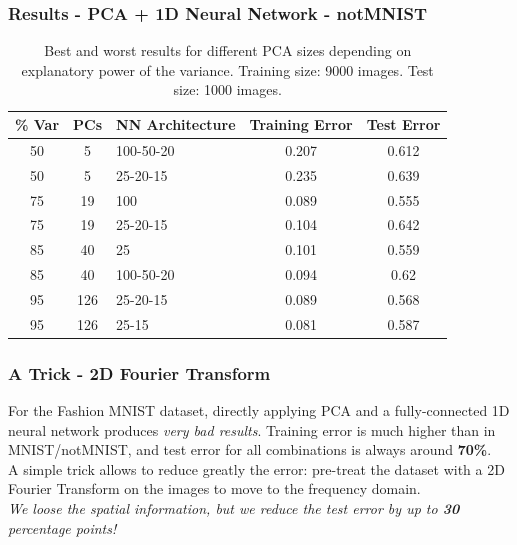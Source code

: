 \documentclass{beamer}
\begin{document}
\begin{frame}
\frametitle{Results - PCA + 1D Neural Network - notMNIST}
\begin{table}[hbt]
  \begin{tabular}{|cc|l|c|c|}
  	\hline
    \% Var & PCs & NN Architecture & Training Error & Test Error \\
    \hline
    \hline
    50 & 5 & 100-50-20 & 0.207    & 0.612\\
    50& 5 & 25-20-15 & 0.235    & 0.639\\
    \hline
    75 & 19 &  100 & 0.089    & 0.555\\
    75 & 19& 25-20-15 & 0.104    & 0.642\\
    \hline
    85 & 40 & 25 & 0.101   &  0.559\\
    85 & 40 & 100-50-20 & 0.094     & 0.62\\
    \hline
    95 & 126 & 25-20-15 & 0.089   &  0.568\\
    95 & 126 & 25-15 & 0.081   &  0.587\\
    \hline
  \end{tabular}
    \vspace{1em}
  \caption{Best and worst results for different PCA sizes depending on explanatory power of the variance. Training size: 9000 images. Test size: 1000 images.}
\end{table}
\end{frame}

\begin{frame}
\frametitle{A Trick - 2D Fourier Transform}
	For the Fashion MNIST dataset, directly applying PCA and a fully-connected 1D neural network produces \textit{very bad results}. Training error is much higher than in MNIST/notMNIST, and test error for all combinations is always around \textbf{70\%}. \\
	\vspace{1em}
	A simple trick allows to reduce greatly the error: pre-treat the dataset with a 2D Fourier Transform on the images to move to the frequency domain. \\
	\vspace{1em}
	\textit{We loose the spatial information, but we reduce the test error by up to \textbf{30} percentage points!}
\end{frame}
\end{document}
